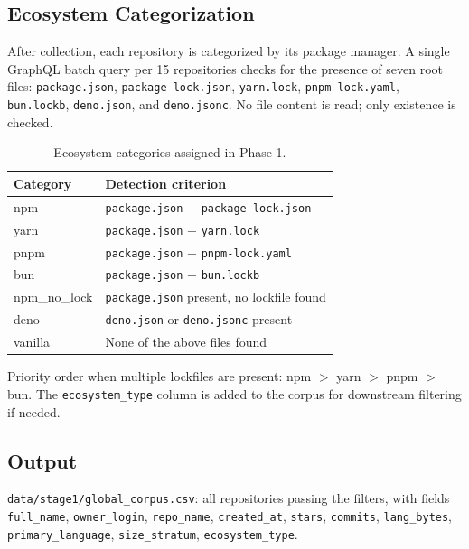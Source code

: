 \documentclass[12pt, a4paper]{article}
\begin{document}
\subsection{Ecosystem Categorization}

After collection, each repository is categorized by its package manager.
A single GraphQL batch query per 15 repositories checks for the presence of
seven root files: \texttt{package.json}, \texttt{package-lock.json},
\texttt{yarn.lock}, \texttt{pnpm-lock.yaml}, \texttt{bun.lockb},
\texttt{deno.json}, and \texttt{deno.jsonc}. No file content is read; only
existence is checked.

\begin{table}[h]
\centering
\caption{Ecosystem categories assigned in Phase 1.}
\begin{tabular}{@{}ll@{}}
\toprule
\textbf{Category} & \textbf{Detection criterion} \\
\midrule
npm          & \texttt{package.json} + \texttt{package-lock.json} \\
yarn         & \texttt{package.json} + \texttt{yarn.lock} \\
pnpm         & \texttt{package.json} + \texttt{pnpm-lock.yaml} \\
bun          & \texttt{package.json} + \texttt{bun.lockb} \\
npm\_no\_lock & \texttt{package.json} present, no lockfile found \\
deno         & \texttt{deno.json} or \texttt{deno.jsonc} present \\
vanilla      & None of the above files found \\
\bottomrule
\end{tabular}
\end{table}

Priority order when multiple lockfiles are present: npm $>$ yarn $>$ pnpm $>$ bun.
The \texttt{ecosystem\_type} column is added to the corpus for downstream
filtering if needed.

\subsection{Output}

\texttt{data/stage1/global\_corpus.csv}: all repositories passing the filters,
with fields \texttt{full\_name}, \texttt{owner\_login}, \texttt{repo\_name},
\texttt{created\_at}, \texttt{stars}, \texttt{commits}, \texttt{lang\_bytes},
\texttt{primary\_language}, \texttt{size\_stratum}, \texttt{ecosystem\_type}.
\end{document}
